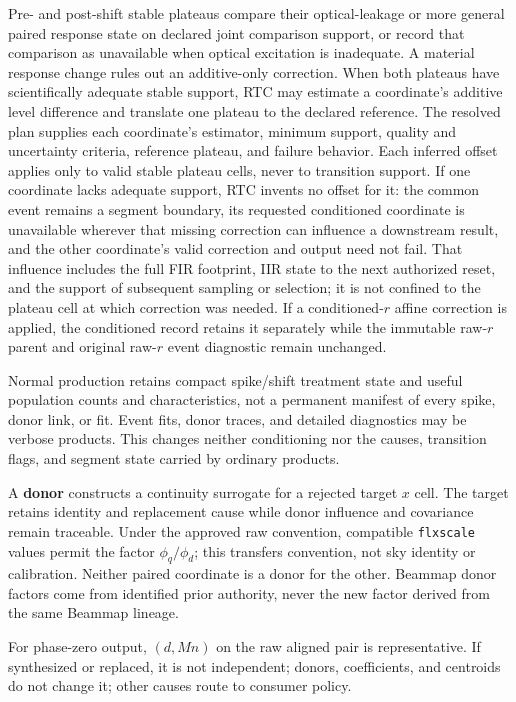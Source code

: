 \documentclass[10pt]{article}
\begin{document}
Pre- and post-shift stable plateaus compare their optical-leakage or more
general paired response state on declared joint comparison support, or record that comparison as
unavailable when optical excitation is inadequate. A material response change
rules out an additive-only correction. When both plateaus have scientifically
adequate stable support, RTC may estimate a coordinate's additive level
difference and translate one plateau to the declared reference. The resolved
plan supplies each coordinate's estimator, minimum support, quality and
uncertainty criteria, reference plateau, and failure behavior. Each inferred
offset applies only to valid stable plateau cells, never to transition
support. If one coordinate lacks adequate support, RTC invents no offset for
it: the common event remains a segment boundary, its requested conditioned
coordinate is unavailable wherever that missing correction can influence a
downstream result, and the other coordinate's valid correction and output
need not fail.  That influence includes the full FIR footprint, IIR state to
the next authorized reset, and the support of subsequent sampling or selection;
it is not confined to the plateau cell at which correction was needed.
If a conditioned-$r$ affine correction is applied, the conditioned record
retains it separately while the immutable raw-$r$ parent and original raw-$r$
event diagnostic remain unchanged.

Normal production retains compact spike/shift treatment state and useful
population counts and characteristics, not a permanent manifest of every
spike, donor link, or fit. Event fits, donor traces, and detailed diagnostics
may be verbose products. This changes neither conditioning nor the causes,
transition flags, and segment state carried by ordinary products.

A \textbf{donor} constructs a continuity surrogate for a rejected target $x$
cell. The target retains identity and replacement cause while donor influence
and covariance remain traceable. Under the approved raw convention, compatible
\texttt{flxscale} values permit the factor $\phi_q/\phi_d$; this transfers
convention, not sky identity or calibration.  Neither paired coordinate is a
donor for the other.  Beammap donor factors come from identified prior authority,
never the new factor derived from the same Beammap lineage.

For phase-zero output, $(d,Mn)$ on the raw aligned pair is representative. If
synthesized or replaced, it is not independent; donors, coefficients, and
centroids do not change it; other causes route to consumer policy.
\end{document}
